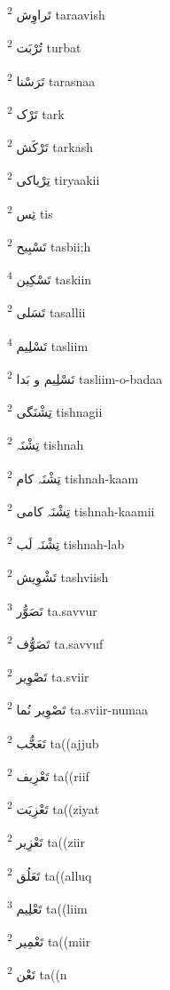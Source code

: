 \documentclass[12pt]{article}
\begin{document}
\begin{multicols}{5}
{\ur تَراوِش}   \textsuperscript{2} taraavish

{\ur تُرْبَت}   \textsuperscript{2} turbat

{\ur تَرَسْنا}   \textsuperscript{2} tarasnaa

{\ur تَرْک}   \textsuperscript{2} tark

{\ur تَرْکَش}   \textsuperscript{2} tarkash

{\ur تِرْیاکی}   \textsuperscript{2} tiryaakii

{\ur تِس}   \textsuperscript{2} tis

{\ur تَسْبِیح}   \textsuperscript{2} tasbii;h

{\ur تَسْکِین}   \textsuperscript{4} taskiin

{\ur تَسَلی}   \textsuperscript{2} tasallii

{\ur تَسْلِیم}   \textsuperscript{4} tasliim

{\ur تَسْلِیم و بَدا}   \textsuperscript{2} tasliim-o-badaa

{\ur تِشْنَگی}   \textsuperscript{2} tishnagii

{\ur تِشْنَہ}   \textsuperscript{2} tishnah

{\ur تِشْنَہ کام}   \textsuperscript{2} tishnah-kaam

{\ur تِشْنَہ کامی}   \textsuperscript{2} tishnah-kaamii

{\ur تِشْنَہ لَب}   \textsuperscript{2} tishnah-lab

{\ur تَشْوِیش}   \textsuperscript{2} tashviish

{\ur تَصَوُّر}   \textsuperscript{3} ta.savvur

{\ur تَصَوُّف}   \textsuperscript{2} ta.savvuf

{\ur تَصْوِیر}   \textsuperscript{2} ta.sviir

{\ur تَصْوِیر نُما}   \textsuperscript{2} ta.sviir-numaa

{\ur تَعَجُّب}   \textsuperscript{2} ta((ajjub

{\ur تَعْرِیف}   \textsuperscript{2} ta((riif

{\ur تَعْزِیَت}   \textsuperscript{2} ta((ziyat

{\ur تَعْزِیر}   \textsuperscript{2} ta((ziir

{\ur تَعَلُق}   \textsuperscript{2} ta((alluq

{\ur تَعْلِیم}   \textsuperscript{3} ta((liim

{\ur تَعْمِیر}   \textsuperscript{2} ta((miir

{\ur تَعْن}   \textsuperscript{2} ta((n


\end{multicols}
\end{document}
